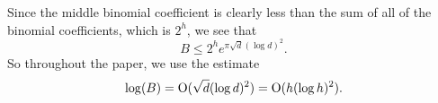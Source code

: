 \documentclass{amsart}
\newcommand{\F}{{\bf{F}}}
\newcommand{\OO}{\mathcal{O}}
\newcommand{\Ell}{{\rm{Ell}}}
\newcommand{\noi}{\noindent}
\newcommand{\bigo}{{\rm O}}
\newcommand{\edit}[1]{\footnote{#1}\marginpar{\hfill {\sf\thefootnote}}}
\theoremstyle{plain}
\begin{document}
Since the middle binomial coefficient is clearly less than the sum of all of the
binomial coefficients, which is $2^h$, 
we see that $$B \le 2^h e^{\pi\sqrt{d}(\log d)^2}.$$
So throughout the paper, we use the estimate
\begin{eqnarray} \label{upperbound}
\log(B) = \bigo (\sqrt{d} (\log d)^2) = \bigo(h (\log h)^2).
\end{eqnarray}
                                            



\end{document}
